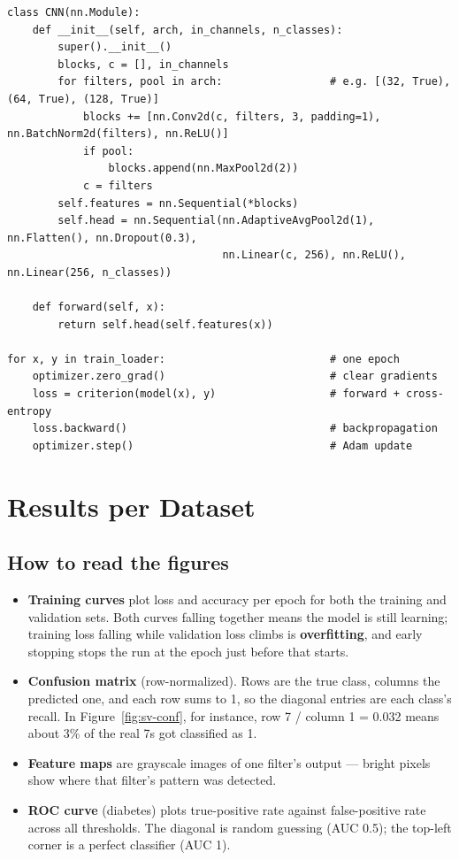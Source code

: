 \documentclass[11pt, a4paper]{article}
\begin{document}
\noindent\begin{minipage}{\linewidth}
\begin{lstlisting}
class CNN(nn.Module):
    def __init__(self, arch, in_channels, n_classes):
        super().__init__()
        blocks, c = [], in_channels
        for filters, pool in arch:                 # e.g. [(32, True), (64, True), (128, True)]
            blocks += [nn.Conv2d(c, filters, 3, padding=1), nn.BatchNorm2d(filters), nn.ReLU()]
            if pool:
                blocks.append(nn.MaxPool2d(2))
            c = filters
        self.features = nn.Sequential(*blocks)
        self.head = nn.Sequential(nn.AdaptiveAvgPool2d(1), nn.Flatten(), nn.Dropout(0.3),
                                  nn.Linear(c, 256), nn.ReLU(), nn.Linear(256, n_classes))

    def forward(self, x):
        return self.head(self.features(x))

for x, y in train_loader:                          # one epoch
    optimizer.zero_grad()                          # clear gradients
    loss = criterion(model(x), y)                  # forward + cross-entropy
    loss.backward()                                # backpropagation
    optimizer.step()                               # Adam update
\end{lstlisting}
\end{minipage}

\section{Results per Dataset}\label{sec:results}

\subsection*{How to read the figures}
\begin{itemize}
\item \textbf{Training curves} plot loss and accuracy per epoch for both the training and validation sets. Both curves
  falling together means the model is still learning; training loss falling while validation loss climbs is
  \textbf{overfitting}, and early stopping stops the run at the epoch just before that starts.
\item \textbf{Confusion matrix} (row-normalized). Rows are the true class, columns the predicted one, and each row
  sums to 1, so the diagonal entries are each class's recall. In Figure~\ref{fig:sv-conf}, for instance, row 7 /
  column 1 = 0.032 means about 3\% of the real 7s got classified as 1.
\item \textbf{Feature maps} are grayscale images of one filter's output — bright pixels show where that filter's
  pattern was detected.
\item \textbf{ROC curve} (diabetes) plots true-positive rate against false-positive rate across all thresholds. The
  diagonal is random guessing (AUC 0.5); the top-left corner is a perfect classifier (AUC 1).
\end{itemize}
\end{document}
